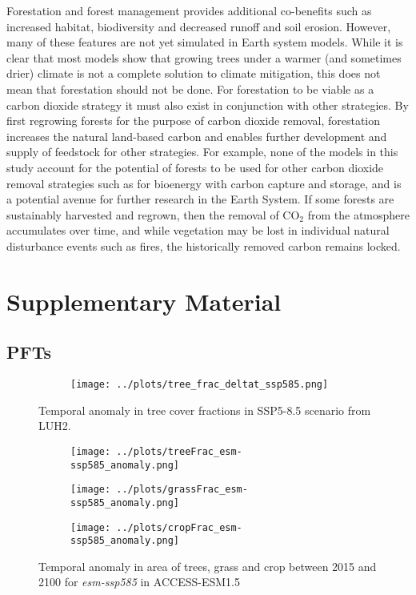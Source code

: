 \documentclass[]{article}
\begin{document}
Forestation and forest management provides additional co-benefits such as increased habitat, biodiversity and decreased runoff and soil erosion.
However, many of these features are not yet simulated in Earth system models.
While it is clear that most models show that growing trees under a warmer (and sometimes drier) climate is not a complete solution to climate mitigation, this does not mean that forestation should not be done.
For forestation to be viable as a carbon dioxide strategy it must also exist in conjunction with other strategies.
By first regrowing forests for the purpose of carbon dioxide removal, forestation increases the natural land-based carbon and enables further development and supply of feedstock for other strategies. 
For example, none of the models in this study account for the potential of forests to be used for other carbon dioxide removal strategies such as for bioenergy with carbon capture and storage, and is a potential avenue for further research in the Earth System.
If some forests are sustainably harvested and regrown, then the removal of CO$_2$ from the atmosphere accumulates over time, and while vegetation may be lost in individual natural disturbance events such as fires, the historically removed carbon remains locked.

\printbibliography

\section{Supplementary Material}
\setcounter{figure}{0}

\subsection{PFTs}

\begin{figure}[H]
    \centering
    \begin{subfigure}[b]{0.45\linewidth}
        \texttt{[image: ../plots/tree\_frac\_deltat\_ssp585.png]}
    \end{subfigure}
    \caption{Temporal anomaly in tree cover fractions in SSP5-8.5 scenario from LUH2.}
    \label{fig:LUH2_tree_frac_ssp585}
\end{figure}

\begin{figure}[H]
    \centering
    \begin{subfigure}[b]{0.4\linewidth}
        \texttt{[image: ../plots/treeFrac\_esm-ssp585\_anomaly.png]}
    \end{subfigure}
    \begin{subfigure}[b]{0.4\linewidth}
        \texttt{[image: ../plots/grassFrac\_esm-ssp585\_anomaly.png]}
    \end{subfigure}
    \begin{subfigure}[b]{0.4\linewidth}
        \texttt{[image: ../plots/cropFrac\_esm-ssp585\_anomaly.png]}
    \end{subfigure}
    \caption{Temporal anomaly in area of trees, grass and crop between 2015 and 2100 for \textit{esm-ssp585} in ACCESS-ESM1.5}
    \label{fig:ACCESS_land_cover}
\end{figure}
\end{document}
